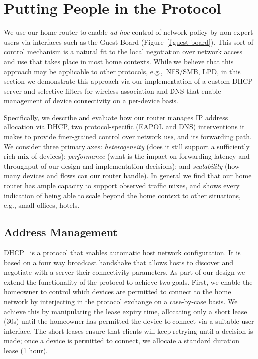 \section{Putting People in the Protocol} \label{s:protocols}

We use our home router to enable \emph{ad hoc} control of network policy by
non-expert users via interfaces such as the Guest Board
(Figure~\ref{f:guest-board}).  This sort of control mechanism is a natural fit
to the local negotiation over network access and use that takes place in most
home contexts.  While we believe that this approach may be applicable to other
protocols, e.g.,~NFS/SMB, LPD, in this section we demonstrate this approach via
our implementation of a custom DHCP server and selective filters for wireless
association and DNS that enable management of device connectivity on a
per-device basis. 

Specifically, we describe and evaluate how our router manages IP address
allocation via DHCP, two protocol-specific (EAPOL and DNS) interventions it
makes to provide finer-grained control over network use, and its forwarding
path.  We consider three primary axes: \emph{heterogeneity} (does it still
support a sufficiently rich mix of devices); \emph{performance} (what is the
impact on forwarding latency and throughput of our design and implementation
decisions); and \emph{scalability} (how many devices and flows can our router
handle).  In general we find that our home router has ample capacity to support
observed traffic mixes, and shows every indication of being able to scale beyond
the home context to other situations, e.g., small offices, hotels. 

\subsection{Address Management} \label{s:addresses}

DHCP~\cite{rfc:2131} is a protocol that enables automatic host network
configuration. It is based on a four way broadcast handshake that allows hosts
to discover and negotiate with a server their connectivity parameters.  As part
of our design we extend the functionality of the protocol to achieve two goals.
First, we enable the homeowner to control which devices are permitted to connect
to the home network by interjecting in the protocol exchange on a case-by-case
basis.  We achieve this by manipulating the lease expiry time, allocating only a
short lease (30s) until the homeowner has permitted the device to connect via a
suitable user interface.  The short leases ensure that clients will keep
retrying until a decision is made; once a device is permitted to connect, we
allocate a standard duration lease (1 hour).

